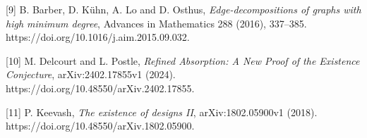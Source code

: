 \documentclass[english,11pt,a4paper]{article}
\begin{document}
\begin{minipage}{\linewidth}
{[}9{]} B. Barber, D. Kühn, A. Lo and D. Osthus, \emph{Edge-decompositions of graphs with high minimum degree}, Advances in Mathematics 288 (2016), 337--385. https://doi.org/10.1016/j.aim.2015.09.032.

{[}10{]} M. Delcourt and L. Postle, \emph{Refined Absorption: A New Proof of the Existence Conjecture}, arXiv:2402.17855v1 (2024). https://doi.org/10.48550/arXiv.2402.17855.

{[}11{]} P. Keevash, \emph{The existence of designs II}, arXiv:1802.05900v1 (2018). https://doi.org/10.48550/arXiv.1802.05900.

\endgroup

\end{minipage}
\end{document}

